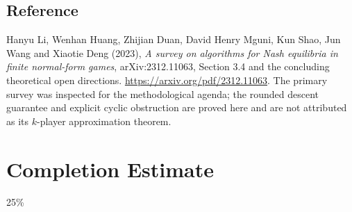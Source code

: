 \documentclass[11pt,a4paper]{article}
\begin{document}
\subsection*{Reference}
Hanyu Li, Wenhan Huang, Zhijian Duan, David Henry Mguni, Kun Shao, Jun Wang and Xiaotie Deng (2023), \emph{A survey on algorithms for Nash equilibria in finite normal-form games}, arXiv:2312.11063, Section 3.4 and the concluding theoretical open directions. \url{https://arxiv.org/pdf/2312.11063}. The primary survey was inspected for the methodological agenda; the rounded descent guarantee and explicit cyclic obstruction are proved here and are not attributed as its $k$-player approximation theorem.

\section{Completion Estimate}
25\%
\end{document}
